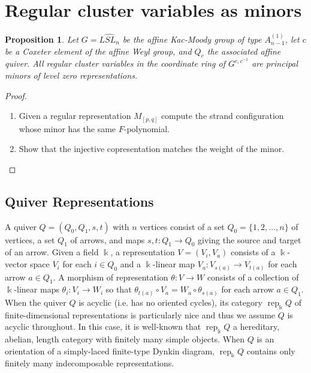 \documentclass[12pt]{amsart}
\newcommand{\kk}{\Bbbk}%
\newcommand{\rep}{\operatorname{rep}}
\newtheorem{proposition}[theorem]{Proposition}
\theoremstyle{remark}
\numberwithin{equation}{section}
\begin{document}
\section{Regular cluster variables as minors}

\begin{proposition}\label{prop:level zero}
Let $G = \widehat{LSL_n}$ be the affine Kac-Moody group of type $A_{n-1}^{(1)}$, let $c$ be a Coxeter element of the affine Weyl group, and $Q_c$ the associated affine quiver.  All regular cluster variables in the coordinate ring of $G^{c,c^{-1}}$ are principal minors of level zero representations.  
\end{proposition}
\begin{proof}
\begin{enumerate}
\item Given a regular representation $M_{[p,q]}$ compute the strand configuration whose minor has the same $F$-polynomial.
\item Show that the injective copresentation matches the weight of the minor.
\end{enumerate}
\end{proof}

\subsection{Quiver Representations}
  A quiver $Q=(Q_0,Q_1,s,t)$ with $n$ vertices consist of a set $Q_0=\{1,2,\ldots,n\}$ of vertices, a set $Q_1$ of arrows, and maps $s,t:Q_1\to Q_0$ giving the source and target of an arrow.  
  Given a field $\kk$, a representation $V=(V_i,V_a)$ consists of a $\kk$-vector space $V_i$ for each $i\in Q_0$ and a $\kk$-linear map $V_a:V_{s(a)}\to V_{t(a)}$ for each arrow $a\in Q_1$.  
  A morphism of representation $\theta:V\to W$ consists of a collection of $\kk$-linear maps $\theta_i:V_i\to W_i$ so that $\theta_{t(a)}\circ V_a=W_a\circ \theta_{s(a)}$ for each arrow $a\in Q_1$.  
  When the quiver $Q$ is acyclic (i.e. has no oriented cycles), its category $\rep_\kk Q$ of finite-dimensional representations is particularly nice and thus we assume $Q$ is acyclic throughout.  
  In this case, it is well-known that $\rep_\kk Q$ a hereditary, abelian, length category with finitely many simple objects.  
  When $Q$ is an orientation of a simply-laced finite-type Dynkin diagram, $\rep_\kk Q$ contains only finitely many indecomposable representations.
\end{document}
